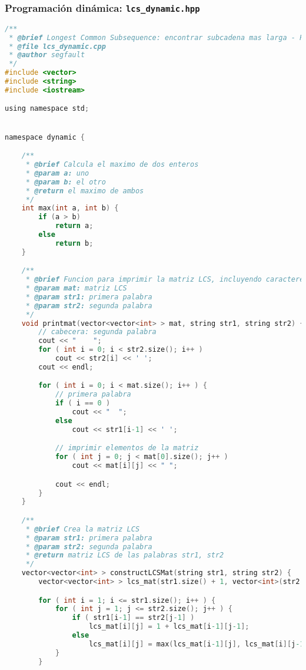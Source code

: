 \documentclass[10pt, a4paper]{article}
\theoremstyle{theorem-style}
\theoremstyle{theorem-style}
\theoremstyle{definition-style}
\theoremstyle{remark-style}
\theoremstyle{example-style}
\theoremstyle{definition-style}
\theoremstyle{remark-style}
\begin{document}
\subsubsection*{Programación dinámica: \texttt{lcs\_dynamic.hpp}}
\begin{lstlisting}[language=C]
/**
 * @brief Longest Common Subsequence: encontrar subcadena mas larga - Programacion Dinamica
 * @file lcs_dynamic.cpp
 * @author segfault
 */
#include <vector>
#include <string>
#include <iostream>

using namespace std;


namespace dynamic {

    /**
     * @brief Calcula el maximo de dos enteros
     * @param a: uno
     * @param b: el otro
     * @return el maximo de ambos
     */
    int max(int a, int b) {
        if (a > b)
            return a;
        else
            return b;
    }

    /**
     * @brief Funcion para imprimir la matriz LCS, incluyendo caracteres
     * @param mat: matriz LCS
     * @param str1: primera palabra
     * @param str2: segunda palabra
     */
    void printmat(vector<vector<int> > mat, string str1, string str2) {
        // cabecera: segunda palabra
        cout << "    ";
        for ( int i = 0; i < str2.size(); i++ )
            cout << str2[i] << ' ';
        cout << endl;

        for ( int i = 0; i < mat.size(); i++ ) {
            // primera palabra
            if ( i == 0 )
                cout << "  ";
            else
                cout << str1[i-1] << ' ';

            // imprimir elementos de la matriz
            for ( int j = 0; j < mat[0].size(); j++ )
                cout << mat[i][j] << " ";

            cout << endl;
        }
    }

    /**
     * @brief Crea la matriz LCS
     * @param str1: primera palabra
     * @param str2: segunda palabra
     * @return matriz LCS de las palabras str1, str2
     */
    vector<vector<int> > constructLCSMat(string str1, string str2) {
        vector<vector<int> > lcs_mat(str1.size() + 1, vector<int>(str2.size() + 1, 0));

        for ( int i = 1; i <= str1.size(); i++ ) {
            for ( int j = 1; j <= str2.size(); j++ ) {
                if ( str1[i-1] == str2[j-1] )
                    lcs_mat[i][j] = 1 + lcs_mat[i-1][j-1];
                else
                    lcs_mat[i][j] = max(lcs_mat[i-1][j], lcs_mat[i][j-1]);
            }
        }


\end{lstlisting}
\end{document}
